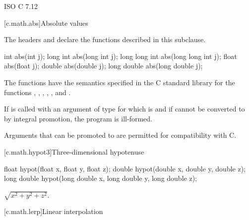 \xref
ISO C 7.12

[c.math.abs]{Absolute values}

\pnum
\begin{note}
The headers  and
declare the functions described in this subclause.
\end{note}

%
\begin{itemdecl}
int abs(int j);
long int abs(long int j);
long long int abs(long long int j);
float abs(float j);
double abs(double j);
long double abs(long double j);
\end{itemdecl}

\begin{itemdescr}
\pnum
\effects
The 
functions have the semantics specified in the C standard library
for the functions , , ,
, , and .

\pnum
\remarks
If  is called with an argument of type 
for which  is  and
if  cannot be converted to 
by integral promotion, the program is ill-formed.
\begin{note}
Arguments that can be promoted to  are permitted for compatibility with C.
\end{note}
\end{itemdescr}


[c.math.hypot3]{Three-dimensional hypotenuse}

%
\begin{itemdecl}
float hypot(float x, float y, float z);
double hypot(double x, double y, double z);
long double hypot(long double x, long double y, long double z);
\end{itemdecl}

\begin{itemdescr}
\pnum
\returns
$\sqrt{x^2+y^2+z^2}$.
\end{itemdescr}

[c.math.lerp]{Linear interpolation}

